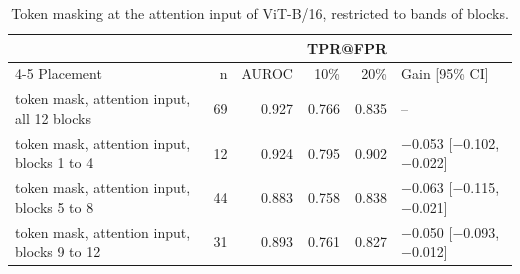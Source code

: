 \begin{table}[htbp]
\centering
\small
\caption{Token masking at the attention input of ViT-B/16, restricted to bands of blocks.}
\label{tab:staircase-bands}
\begin{tabular}{lrrrrl}
\toprule
 & & & \multicolumn{2}{c}{TPR@FPR} & \\
\cmidrule(lr){4-5}
Placement & n & AUROC & 10\% & 20\% & Gain [95\% CI] \\
\midrule
token mask, attention input, all 12 blocks & 69 & 0.927 & 0.766 & 0.835 & -- \\
token mask, attention input, blocks 1 to 4 & 12 & 0.924 & 0.795 & 0.902 & $-$0.053 [$-$0.102, $-$0.022] \\
token mask, attention input, blocks 5 to 8 & 44 & 0.883 & 0.758 & 0.838 & $-$0.063 [$-$0.115, $-$0.021] \\
token mask, attention input, blocks 9 to 12 & 31 & 0.893 & 0.761 & 0.827 & $-$0.050 [$-$0.093, $-$0.012] \\
\bottomrule
\end{tabular}
\end{table}
